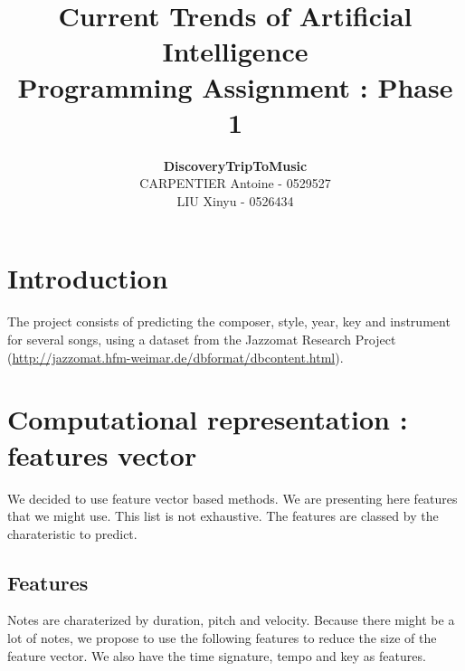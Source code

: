 \documentclass[a4paper,12pt]{article}
\author{\textbf{DiscoveryTripToMusic}\\CARPENTIER Antoine - 0529527 \\LIU Xinyu - 0526434}
\title{Current Trends of Artificial Intelligence\\ \small Programming Assignment : Phase 1}
\begin{document}
\maketitle

\section{Introduction}

The project consists of predicting the composer, style, year, key and instrument for several songs, using a dataset from the Jazzomat Research Project (\url{http://jazzomat.hfm-weimar.de/dbformat/dbcontent.html}).

\section{Computational representation : features vector}

We decided to use feature vector based methods. We are presenting here features that we might use. This list is not exhaustive. The features are classed by the charateristic to predict.

\subsection{Features}
    Notes are charaterized by duration, pitch and velocity. Because there might be a lot of notes, we propose to use the following features to reduce the size of the feature vector. We also have the time signature, tempo and key as features.
\end{document}
